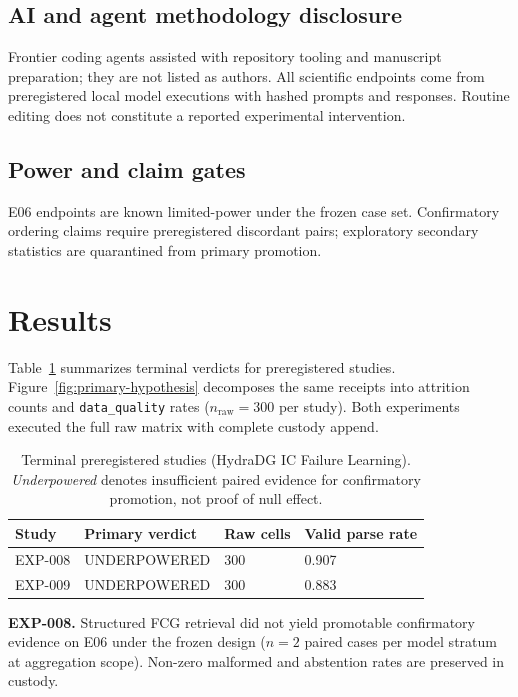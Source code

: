 \documentclass{article}
\begin{document}
\subsection{AI and agent methodology disclosure}

Frontier coding agents assisted with repository tooling and manuscript preparation; they are not listed as authors.
All scientific endpoints come from preregistered local model executions with hashed prompts and responses.
Routine editing does not constitute a reported experimental intervention.

\subsection{Power and claim gates}

E06 endpoints are known limited-power under the frozen case set.
Confirmatory ordering claims require preregistered discordant pairs; exploratory secondary statistics are quarantined from primary promotion.

\section{Results}

Table~\ref{tab:terminal} summarizes terminal verdicts for preregistered studies.
Figure~\ref{fig:primary-hypothesis} decomposes the same receipts into attrition counts and \texttt{data\_quality} rates ($n_{\mathrm{raw}}=300$ per study).
Both experiments executed the full raw matrix with complete custody append.

\begin{table}[t]
  \centering
  \caption{Terminal preregistered studies (HydraDG IC Failure Learning). \emph{Underpowered} denotes insufficient paired evidence for confirmatory promotion, not proof of null effect.}
  \label{tab:terminal}
  \begin{tabular}{llll}
    \toprule
    Study & Primary verdict & Raw cells & Valid parse rate \\
    \midrule
    EXP-008 & UNDERPOWERED & 300 & 0.907 \\
    EXP-009 & UNDERPOWERED & 300 & 0.883 \\
    \bottomrule
  \end{tabular}
\end{table}

\textbf{EXP-008.} Structured FCG retrieval did not yield promotable confirmatory evidence on E06 under the frozen design ($n=2$ paired cases per model stratum at aggregation scope). Non-zero malformed and abstention rates are preserved in custody.
\end{document}
